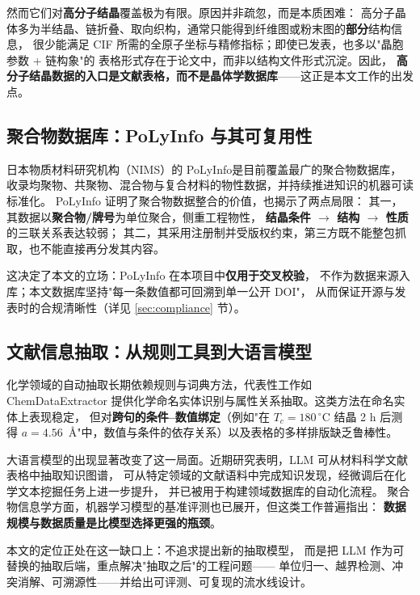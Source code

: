 \documentclass[11pt,a4paper]{ctexart}
\begin{document}
然而它们对\textbf{高分子结晶}覆盖极为有限。原因并非疏忽，而是本质困难：
高分子晶体多为半结晶、链折叠、取向织构，通常只能得到纤维图或粉末图的\textbf{部分}结构信息，
很少能满足 CIF 所需的全原子坐标与精修指标；即使已发表，也多以"晶胞参数 + 链构象"的
表格形式存在于论文中，而非以结构文件形式沉淀。因此，
\textbf{高分子结晶数据的入口是文献表格，而不是晶体学数据库}——这正是本文工作的出发点。

\subsection{聚合物数据库：PoLyInfo 与其可复用性}

日本物质材料研究机构（NIMS）的 PoLyInfo\cite{otsuka2011,ishii2024}是目前覆盖最广的聚合物数据库，
收录均聚物、共聚物、混合物与复合材料的物性数据，并持续推进知识的机器可读标准化。
PoLyInfo 证明了聚合物数据整合的价值，也揭示了两点局限：
其一，其数据以\textbf{聚合物/牌号}为单位聚合，侧重工程物性，
\textbf{结晶条件 $\rightarrow$ 结构 $\rightarrow$ 性质}的三联关系表达较弱；
其二，其采用注册制并受版权约束，第三方既不能整包抓取，也不能直接再分发其内容。

这决定了本文的立场：PoLyInfo 在本项目中\textbf{仅用于交叉校验}，
不作为数据来源入库；本文数据库坚持"每一条数值都可回溯到单一公开 DOI"，
从而保证开源与发表时的合规清晰性（详见 \ref{sec:compliance} 节）。

\subsection{文献信息抽取：从规则工具到大语言模型}

化学领域的自动抽取长期依赖规则与词典方法，代表性工作如 ChemDataExtractor\cite{swain2016}
提供化学命名实体识别与属性关系抽取。这类方法在命名实体上表现稳定，
但对\textbf{跨句的条件--数值绑定}（例如"在 $T_c=180\,^\circ\mathrm{C}$ 结晶 2 h 后测得
$a=4.56$~\AA"中，数值与条件的依存关系）以及表格的多样排版缺乏鲁棒性。

大语言模型的出现显著改变了这一局面。近期研究表明，LLM 可从材料科学文献表格中抽取知识图谱\cite{dreger2025}，
可从特定领域的文献语料中完成知识发现\cite{su2025}，经微调后在化学文本挖掘任务上进一步提升\cite{zhang2024}，
并已被用于构建领域数据库的自动化流程\cite{itani2025}。
聚合物信息学方面，机器学习模型的基准评测也已展开\cite{tao2021}，但这类工作普遍指出：
\textbf{数据规模与数据质量是比模型选择更强的瓶颈}。

本文的定位正处在这一缺口上：不追求提出新的抽取模型，
而是把 LLM 作为可替换的抽取后端，重点解决"抽取之后"的工程问题——
单位归一、越界检测、冲突消解、可溯源性——并给出可评测、可复现的流水线设计。
\end{document}

